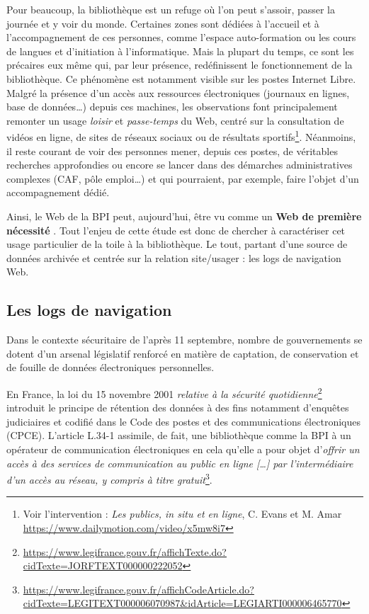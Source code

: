 \documentclass[symmetric,justified,marginals=raggedouter]{tufte-book}
\begin{document}
\noindent Pour beaucoup, la bibliothèque est un refuge où l'on peut s'assoir, passer la journée et y voir du monde. Certaines zones sont dédiées à l'accueil et à l'accompagnement de ces personnes, comme l'espace auto-formation ou les cours de langues et d'initiation à l'informatique. Mais la plupart du temps, ce sont les précaires eux même qui, par leur présence, redéfinissent le fonctionnement de la bibliothèque. Ce phénomène est notamment visible sur les postes Internet Libre. Malgré la présence d'un accès aux ressources électroniques (journaux en lignes, base de données\ldots{}) depuis ces machines, les observations font principalement remonter un usage \textit{loisir} et \textit{passe-temps} du Web, centré sur la consultation de vidéos en ligne, de sites de réseaux sociaux ou de résultats sportifs\footnote{\RaggedOuter Voir l'intervention : \textit{Les publics, in situ et en ligne}, C. Evans et M. Amar  \url{https://www.dailymotion.com/video/x5mw8i7}}. Néanmoins, il reste courant de voir des personnes mener, depuis ces postes, de véritables recherches approfondies ou encore se lancer dans des démarches administratives complexes (CAF, pôle emploi\ldots{}) et qui pourraient, par exemple, faire l'objet d'un accompagnement dédié. 

Ainsi, le Web de la BPI peut, aujourd'hui, être vu comme un \textbf{Web de première nécessité} \citep{pasquier_classes_2018}. Tout l'enjeu de cette étude est donc de chercher à caractériser cet usage particulier de la toile à la bibliothèque. Le tout, partant d'une source de données archivée et centrée sur la relation site/usager : les logs de navigation Web. 

\subsection{Les logs de navigation}

\noindent Dans le contexte sécuritaire de l'après 11 septembre, nombre de gouvernements se dotent d'un arsenal législatif renforcé en matière de captation, de conservation et de fouille de données électroniques personnelles. 

En France, la loi du 15 novembre 2001 \textit{relative à la sécurité quotidienne}\footnote{\RaggedOuter \url{https://www.legifrance.gouv.fr/affichTexte.do?cidTexte=JORFTEXT000000222052}} introduit le principe de rétention des données à des fins notamment d'enquêtes judiciaires et codifié dans le Code des postes et des communications électroniques (CPCE). L'article L.34-1 assimile, de fait, une bibliothèque comme la BPI à un opérateur de communication électroniques en cela qu'elle a pour objet d'\og\textit{offrir un accès à des services de communication au public en ligne [\ldots{}] par l'intermédiaire d'un accès au réseau, y compris à titre gratuit}\fg{}\footnote{\RaggedOuter \url{https://www.legifrance.gouv.fr/affichCodeArticle.do?cidTexte=LEGITEXT000006070987\&idArticle=LEGIARTI000006465770}}. 
\end{document}
